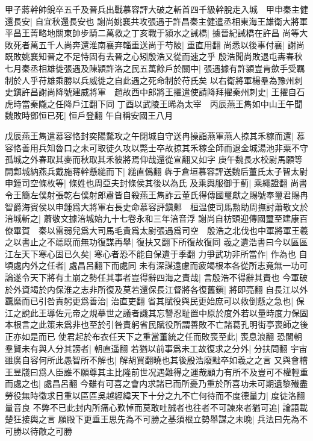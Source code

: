 甲子蔣幹帥銳卒五千及晉兵出戰慕容評大破之斬首四千級幹脫走入城　甲申秦主健還長安|{
	自宜秋還長安也}
謝尚姚襄共攻張遇于許昌秦主健遣丞相東海王雄衛大將軍平昌王菁略地關東帥步騎二萬救之丁亥戰于潁水之誡橋|{
	據晉紀誡橋在許昌}
尚等大敗死者萬五千人尚奔還淮南襄弃輜重送尚于芍陂|{
	重直用翻}
尚悉以後事付襄|{
	謝尚既敗姚襄知晉之不足恃固有去晉之心矧殷浩又從而速之乎}
殷浩聞尚敗退屯夀春秋七月秦丞相雄徙張遇及陳潁許洛之民五萬餘戶於關中|{
	張遇據有許潁豈肯歛手受羈制於人乎苻雄乘勝以兵威徙之自此遇之死命制於苻氏矣}
以右衛將軍楊羣為豫州刺史鎭許昌謝尚降號建威將軍　趙故西中郎將王擢遣使請降拜擢秦州刺史|{
	王擢自石虎時當秦隴之任降戶江翻下同}
丁酉以武陵王晞為太宰　丙辰燕王雋如中山王午聞魏敗時鄧恒已死|{
	恒戶登翻}
午自稱安國王八月

戊辰燕王雋遣慕容恪封奕陽騖攻之午閉城自守送冉操詣燕軍燕人掠其禾稼而還|{
	慕容恪善用兵知魯口之未可取徒久攻以斃士卒故掠其禾稼全師而退金城湯池非粟不守孤城之外春取其麥而秋取其禾彼將焉仰哉還從宣翻又如字}
庚午魏長水校尉馬願等開鄴城納燕兵戴施蒋幹懸縋而下|{
	縋直僞翻}
犇于倉垣慕容評送魏后董氏太子智太尉申鍾司空條枚等|{
	條姓也周亞夫封條侯其後以為氏}
及乘輿服御于薊|{
	乘繩證翻}
尚書令王簡左僕射張乾右僕射郎肅皆自殺燕王雋詐云董氏得傳國璽獻之賜號奉璽君賜冉智爵海賓侯以申鍾爲大將軍右長史命慕容評鎭鄴　桓温使司馬勲助周撫討蕭敬文於涪城斬之|{
	蕭敬文據涪城始九十七卷永和三年涪音浮}
謝尚自枋頭迎傳國璽至建康百僚畢賀　秦以雷弱兒爲大司馬毛貴爲太尉張遇爲司空　殷浩之北伐也中軍將軍王羲之以書止之不聼既而無功復謀再舉|{
	復扶又翻下所復故復同}
羲之遺浩書曰今以區區江左天下寒心固已久矣|{
	寒心者恐不能自保遺于季翻}
力爭武功非所當作|{
	作為也}
自頃處内外之任者|{
	處昌呂翻下而處同}
未有深謀遠慮而疲竭根本各從所志竟無一功可論遂令天下將有土崩之勢任其事者豈得辭四海之責哉|{
	言殷浩不得辭其責也}
今軍破於外資竭於内保淮之志非所復及莫若還保長江督將各復舊鎭|{
	將即亮翻}
自長江以外覊縻而已引咎責躬更爲善治|{
	治直吏翻}
省其賦役與民更始庶可以救倒懸之急也|{
	保江之說此王導佐元帝之規摹世之議者譏其忘讐忍耻置中原於度外若以量時度力保固本根言之此策未爲非也至於引咎責躬省民賦役所謂善敗不亡諸葛孔明街亭喪師之後正亦如是而已}
使君起於布衣任天下之重當董統之任而敗喪至此|{
	喪息浪翻}
恐闔朝羣賢未有與人分其謗者|{
	朝直遥翻}
若猶以前事爲未工故復求之分外|{
	分扶問翻}
宇宙雖廣自容何所此愚智所不解也|{
	解胡買翻曉也其後殷浩廢黜卒如羲之之言}
又與會稽王昱牋曰爲人臣誰不願尊其主比隆前世况遇難得之運哉顧力有所不及豈可不權輕重而處之也|{
	處昌呂翻}
今雖有可喜之會内求諸已而所憂乃重於所喜功未可期遺黎殱盡勞役無時徵求日重以區區吳越經緯天下十分之九不亡何待而不度德量力|{
	度徒洛翻量音良}
不弊不已此封内所痛心歎悼而莫敢吐誠者也往者不可諫來者猶可追|{
	論語載楚狂接輿之言}
願殿下更垂王思先為不可勝之基須根立勢舉謀之未晩|{
	兵法曰先為不可勝以待敵之可勝}
